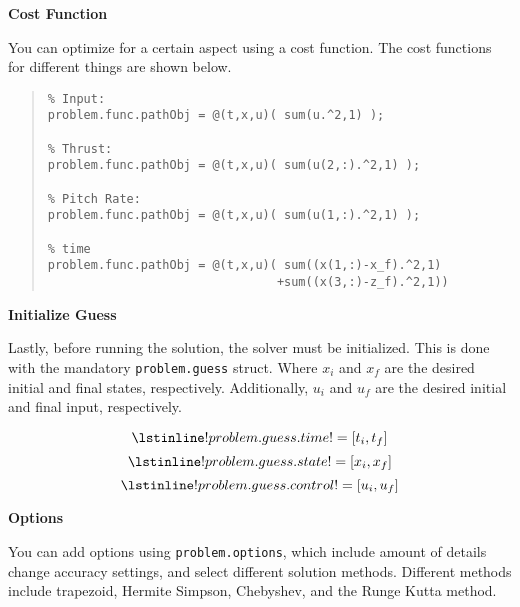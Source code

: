 \documentclass[12pt]{article}
\begin{document}
\clearpage

\begin{flushleft}
{\Large \textbf{\textbf{Cost Function}} }
\end{flushleft}
You can optimize for a certain aspect using a cost function. The cost functions for different things are shown below. 
\begin{quote}
\begin{lstlisting}
% Input:
problem.func.pathObj = @(t,x,u)( sum(u.^2,1) );

% Thrust:
problem.func.pathObj = @(t,x,u)( sum(u(2,:).^2,1) );

% Pitch Rate:
problem.func.pathObj = @(t,x,u)( sum(u(1,:).^2,1) );

% time
problem.func.pathObj = @(t,x,u)( sum((x(1,:)-x_f).^2,1) 
                                +sum((x(3,:)-z_f).^2,1))

\end{lstlisting}
\end{quote}


\begin{flushleft}
{\Large \textbf{\textbf{Initialize Guess}} }
\end{flushleft}

Lastly, before running the solution, the solver must be initialized. This is done with the mandatory \lstinline!problem.guess! struct. Where $x_{i}$ and $x_{f}$ are the desired initial and final states, respectively. Additionally, $u_{i}$ and $u_{f}$ are the desired initial and final input, respectively. 

\begin{figure}[H]
\begin{equation*}
\lstinline!problem.guess.time! = [t_{i}, t_{f}]
\end{equation*}
\begin{equation*}
\lstinline!problem.guess.state! = [x_{i}, x_{f}]
\end{equation*}
\begin{equation*}
\lstinline!problem.guess.control! = [u_{i}, u_{f}] 
\end{equation*}
\end{figure}
\begin{flushleft}
{\Large \textbf{\textbf{Options}} }
\end{flushleft}

You can add options using \lstinline!problem.options!, which include amount of details change accuracy settings, and select different solution methods. Different methods include trapezoid, Hermite Simpson, Chebyshev, and the Runge Kutta method.
\newline
\end{document}
